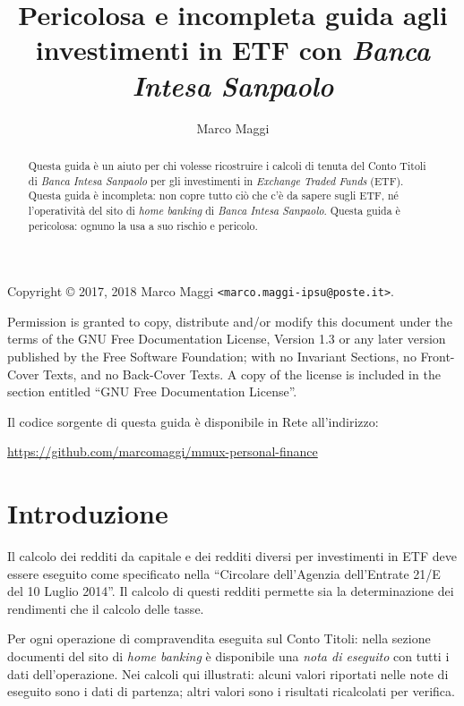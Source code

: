 \documentclass[12pt,a4paper]{article}
\author{Marco Maggi}
\title{Pericolosa e incompleta guida agli investimenti in ETF con \emph{Banca Intesa Sanpaolo}}
\begin{document}
\maketitle

\begin{abstract}
  Questa guida è un  aiuto per chi volesse ricostruire i calcoli  di tenuta del Conto
  Titoli  di \emph{Banca  Intesa  Sanpaolo} per  gli  investimenti in  \emph{Exchange
     Traded Funds} (ETF).  Questa guida è incompleta:  non copre tutto ciò che c'è da
  sapere sugli ETF,  né l'operatività del sito di \emph{home  banking} di \emph{Banca
     Intesa Sanpaolo}.   Questa guida  è pericolosa:  ognuno la usa  a suo  rischio e
  pericolo.
\end{abstract}

\tableofcontents

\newpage{}

\noindent
Copyright \copyright{} 2017, 2018 Marco Maggi \texttt{<marco.maggi-ipsu@poste.it>}.

Permission is granted to copy, distribute and/or modify this document under the terms
of the GNU Free Documentation License, Version  1.3 or any later version published by
the Free Software  Foundation; with no Invariant Sections, no  Front-Cover Texts, and
no Back-Cover Texts.  A copy of the license is included in the section entitled ``GNU
Free Documentation License''.

Il codice sorgente di questa guida è disponibile in Rete all'indirizzo:
\begin{center}
  \url{https://github.com/marcomaggi/mmux-personal-finance}
\end{center}

\newpage{}

\section{Introduzione}


Il calcolo dei redditi da capitale e dei redditi diversi per investimenti in ETF deve
essere eseguito come specificato nella ``Circolare dell'Agenzia dell'Entrate 21/E del
10 Luglio  2014''.  Il calcolo di  questi redditi permette sia  la determinazione dei
rendimenti che il calcolo delle tasse.

Per  ogni  operazione di  compravendita  eseguita  sul  Conto Titoli:  nella  sezione
documenti del sito  di \emph{home banking} è disponibile una  \emph{nota di eseguito}
con  tutti  i  dati  dell'operazione.   Nei calcoli  qui  illustrati:  alcuni  valori
riportati  nelle note  di eseguito  sono  i dati  di  partenza; altri  valori sono  i
risultati ricalcolati per verifica.
\end{document}
